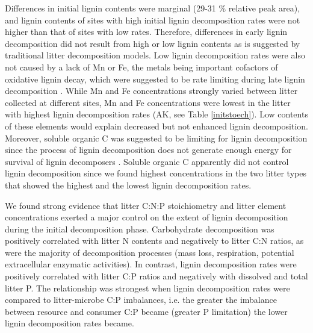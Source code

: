 Differences in initial lignin contents were marginal (29-31 \% relative peak area), and lignin contents of sites with high initial lignin decomposition rates were not higher than that of sites with low rates. Therefore, differences in early lignin decomposition did not result from high or low lignin contents as is suggested by traditional litter decomposition models. Low lignin decomposition rates were also not caused by a lack of Mn or Fe, the metals being important cofactors of oxidative lignin decay, which were suggested to be rate limiting during late lignin decomposition \cite{Berg2008}. While Mn and Fe concentrations strongly varied between litter collected at different sites, Mn and Fe concentrations were lowest in the litter with highest lignin decomposition rates (AK, see Table \ref{initstoech}). Low contents of these elements would explain decreased but not enhanced lignin decomposition. Moreover, soluble organic C was suggested to be limiting for lignin decomposition since the process of lignin decomposition does not generate enough energy for survival of lignin decomposers \cite{Klotzbucher2011}. Soluble organic C apparently did not control lignin decomposition since we found highest concentrations in the two litter types that showed the highest and the lowest lignin decomposition rates.

We found strong evidence that litter C:N:P stoichiometry and litter element concentrations exerted a major control on the extent of lignin decomposition during the initial decomposition phase. Carbohydrate decomposition was positively correlated with litter N contents and negatively to litter C:N ratios, as were the majority of decomposition processes (mass loss, respiration, potential extracellular enzymatic activities). In contrast, lignin decomposition rates were positively correlated with litter C:P ratios and negatively with dissolved and total litter P. The relationship was strongest when lignin decomposition rates were compared to litter-microbe C:P imbalances, i.e. the greater the imbalance between resource and consumer C:P became (greater P limitation) the lower lignin decomposition rates became.

